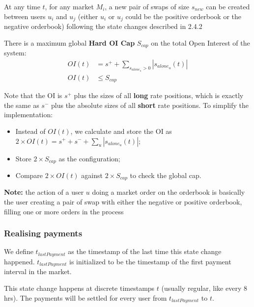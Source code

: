 \documentclass{article}%
\begin{document}
At any time $t$, for any market $M_i$, a new pair of swaps of size $s_{new}$ can be created between users $u_i$ and $u_j$ (either $u_i$ or $u_j$ could be the positive orderbook or the negative orderbook) following the state changes described in 2.4.2

There is a maximum global  \textbf{Hard OI Cap} $S_{cap}$ on the total Open Interest of the system:
    \begin{align*}
        OI(t) &= s^+ + \sum_{s_{alone_u} > 0} |s_{alone_u}(t)| \\
        OI(t) &\leq S_{cap}
    \end{align*}

Note that the OI is $s^+$ plus the sizes of all \textbf{long} rate positions, which is exactly the same as $s^-$ plus the absolute sizes of all \textbf{short} rate positions. To simplify the implementation:
\begin{itemize}
    \item Instead of $OI(t)$, we calculate and store the OI as $2 \times OI(t) = s^+ + s^- + \sum_u |s_{alone_u}(t)|$;
    \item Store $2 \times S_{cap}$ as the configuration;
    \item Compare $2 \times OI(t)$ against $2 \times S_{cap}$ to check the global cap.
\end{itemize}

\textbf{Note:} the action of a user $u$ doing a market order on the orderbook is basically the user creating a pair of swap with either the negative or positive orderbook, filling one or more orders in the process\\

\subsubsection{Realising payments}
We define $t_{lastPayment}$ as the timestamp of the last time this state change happened. $t_{lastPayment}$ is initialized to be the timestamp of the first payment interval in the market.

This state change happens at discrete timestamps $t$ (usually regular, like every 8 hrs). The payments will be settled for every user from $t_{lastPayment}$ to $t$.
\end{document}
